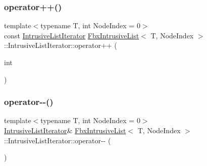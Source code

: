 \subsubsection{\texorpdfstring{operator++()}{operator++()}\hspace{0.1cm}{\footnotesize\ttfamily [2/2]}}
{\footnotesize\ttfamily template$<$typename T, int Node\+Index = 0$>$ \\
const \hyperlink{class_fbx_intrusive_list_1_1_intrusive_list_iterator}{Intrusive\+List\+Iterator} \hyperlink{class_fbx_intrusive_list}{Fbx\+Intrusive\+List}$<$ T, Node\+Index $>$\+::Intrusive\+List\+Iterator\+::operator++ (\begin{DoxyParamCaption}\item[{int}]{ }\end{DoxyParamCaption})}

\mbox{\label{class_fbx_intrusive_list_1_1_intrusive_list_iterator_a4e2124e583c78c84dfe33edbdc44212d}} 
\subsubsection{\texorpdfstring{operator-\/-\/()}{operator--()}\hspace{0.1cm}{\footnotesize\ttfamily [1/2]}}
{\footnotesize\ttfamily template$<$typename T, int Node\+Index = 0$>$ \\
\hyperlink{class_fbx_intrusive_list_1_1_intrusive_list_iterator}{Intrusive\+List\+Iterator}\& \hyperlink{class_fbx_intrusive_list}{Fbx\+Intrusive\+List}$<$ T, Node\+Index $>$\+::Intrusive\+List\+Iterator\+::operator-\/-\/ (\begin{DoxyParamCaption}{ }\end{DoxyParamCaption})}

\mbox{\label{class_fbx_intrusive_list_1_1_intrusive_list_iterator_a7afb5eb0843b79c64a8fbe87b604a651}} 
